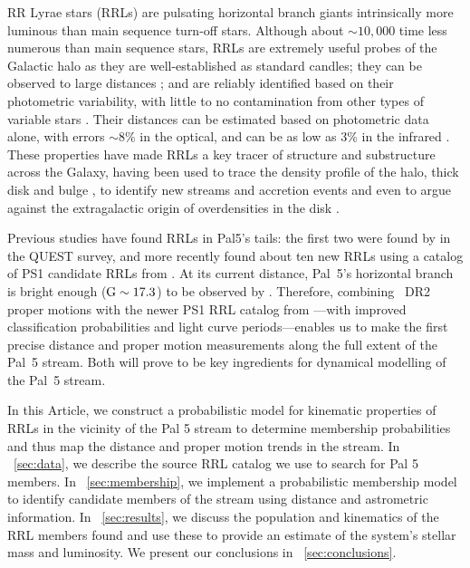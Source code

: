 \documentclass[twocolumn]{aastex63}
\begin{document}
RR Lyrae stars (RRLs) are pulsating horizontal branch giants intrinsically more luminous than main sequence turn-off stars. Although about $\sim 10,000$ time less numerous than main sequence stars, RRLs are extremely useful probes of the Galactic halo as they are well-established as standard candles; they can be observed to large distances \citep{Medina:2018,Sesar:2017c}; and are reliably identified based on their photometric variability, with little to no contamination from other types of variable stars \citep[e.g.,][]{Holl:2018,Drake:2017,Mateu:2012}. Their distances can be estimated based on photometric data alone, with errors $\sim8\%$ in the optical, and can be as low as 3\% in the infrared \citep{Neeley:2017}. These properties have made RRLs a key tracer of structure and substructure across the Galaxy, having been used to trace the density profile of the halo, thick disk and bulge \citep[e.g.,][and reference therein]{Iorio:2018,Mateu:2018b,Kunder:2008}, to identify new streams and accretion events \citep[e.g.]{Duffau:2006,Sesar:2010,Mateu:2018,Iorio:2019} and even to argue against the extragalactic origin of overdensities in the disk \citep{Mateu:2009, Price-Whelan:2015}.

Previous studies have found RRLs in Pal5's tails: the first two were found by \citet{Vivas:2001} in the QUEST survey, and more recently \citep{Ibata:2017} found about ten new RRLs using a catalog of PS1 candidate RRLs from \citet{Hernitschek:2016}. At its current distance, Pal~5's horizontal branch is bright enough (${\mathrm{G}}\sim17.3$) to be observed by \Gaia. Therefore, combining \Gaia~DR2 proper motions with the newer PS1 RRL catalog from \citet{Sesar:2017b}---with improved classification probabilities and light curve periods---enables us to make the first precise distance and proper motion measurements along the full extent of the Pal~5 stream. Both will prove to be key ingredients for dynamical modelling of the Pal~5 stream.

In this Article, we construct a probabilistic model for kinematic properties of RRLs in the vicinity of the Pal 5 stream to determine membership probabilities and thus map the distance and proper motion trends in the stream.
In \sectionname~\ref{sec:data}, we describe the source RRL catalog we use to search for Pal 5 members.
In \sectionname~\ref{sec:membership}, we implement a probabilistic membership model to identify candidate members of the stream using distance and astrometric information.
In \sectionname~\ref{sec:results}, we discuss the population and kinematics of the RRL members found and use these to provide an estimate of the system's stellar mass and luminosity.
We present our conclusions in \sectionname~\ref{sec:conclusions}.
\end{document}
